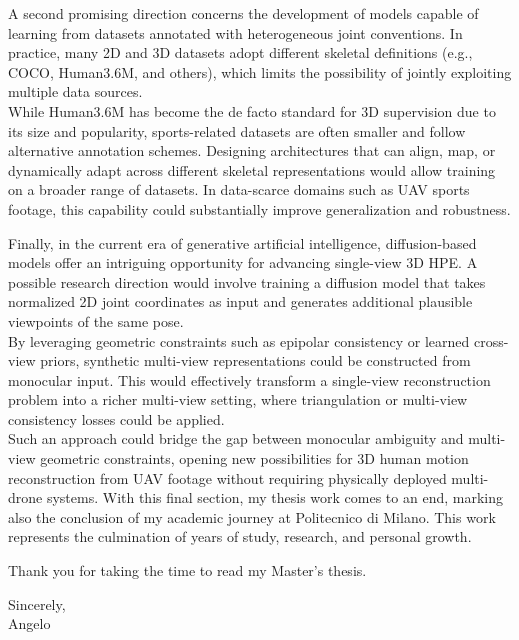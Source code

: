 A second promising direction concerns the development of models capable of learning from datasets annotated with heterogeneous joint conventions. In practice, many 2D and 3D datasets adopt different skeletal definitions 
(e.g., COCO, Human3.6M, and others), which limits the possibility of jointly exploiting multiple data sources.\\ 
While Human3.6M \cite{ionescu2013human3} has become the de facto standard for 3D supervision due to its size and popularity, sports-related datasets are often smaller and follow alternative annotation schemes. Designing architectures that can align, map, 
or dynamically adapt across different skeletal representations would allow training on a broader range of datasets. In data-scarce domains such as UAV sports footage, this capability could substantially improve generalization and robustness.

Finally, in the current era of generative artificial intelligence, diffusion-based models offer an intriguing opportunity for advancing single-view 3D HPE. A possible research direction would involve 
training a diffusion model that takes normalized 2D joint coordinates as input and generates additional plausible viewpoints of the same pose.\\
By leveraging geometric constraints such as epipolar consistency or learned cross-view priors, synthetic multi-view representations could be constructed from monocular input. This would effectively 
transform a single-view reconstruction problem into a richer multi-view setting, where triangulation or multi-view consistency losses could be applied.\\ 
Such an approach could bridge the gap between monocular ambiguity and multi-view geometric constraints, opening new possibilities for 3D human motion reconstruction from UAV footage without requiring 
physically deployed multi-drone systems.
\newpage
\null\vspace{1cm}
With this final section, my thesis work comes to an end, marking also the conclusion of my academic journey at Politecnico di Milano. This work represents the culmination of years of study, research, and personal growth.

Thank you for taking the time to read my Master's thesis.

\vspace{0.5cm}

\noindent
Sincerely,\\
Angelo